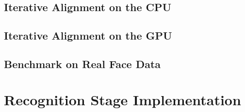 \documentclass[10pt,twocolumn,letterpaper]{article}
\begin{document}
\subsection{Iterative Alignment on the CPU}

\subsection{Iterative Alignment on the GPU}

\subsection{Benchmark on Real Face Data}


\section{Recognition Stage Implementation}
\end{document}
